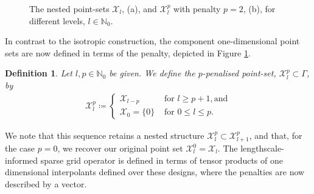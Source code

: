 \documentclass[pdflatex,sn-mathphys-num]{sn-jnl}%
\theoremstyle{thmstyleone}%
\theoremstyle{thmstyletwo}%
\theoremstyle{thmstylethree}%
\newtheorem{definition}{Definition}%
\begin{document}
\begin{figure}[h]
\begin{tikzpicture}
        
    \end{tikzpicture}
    \caption{The nested point-sets \(\mathcal{X}_l\), (a), and \(\mathcal{X}_l^p\) with penalty \(p=2\), (b), for different levels, \(l\in\mathbb{N}_0\). 
    }
    \label{fig: point sets}
\end{figure}

In contrast to the isotropic construction, the component one-dimensional point sets are now defined in terms of the penalty, depicted in Figure \ref{fig: point sets}.
\begin{definition}\label{def:chi_l^p}
    Let \(l,p\in\mathbb{N}_0\) be given. We define the \(p\)-\emph{penalised point-set}, \(\mathcal{X}_{l}^p\subset\Gamma\), by 
    \begin{align}
        \mathcal{X}_{l}^p\coloneqq\begin{cases}
            \mathcal{X}_{l-p}\quad&\textrm{ for }l\geq p+1, \textrm{and}\\
            \mathcal{X}_{0}=\{0\}&\textrm{ for }0\leq l\leq p.\end{cases}\nonumber
    \end{align}
\end{definition}
We note that this sequence retains a nested structure \(\mathcal{X}_l^p\subset\mathcal{X}_{l+1}^p\), and that, for the case \(p=0\), we recover our original point set \(\mathcal{X}_l^0= \mathcal{X}_l\). The lengthscale-informed sparse grid operator is defined in terms of tensor products of one dimensional interpolants defined over these designs, where the penalties are now described by a vector. 
\end{document}
